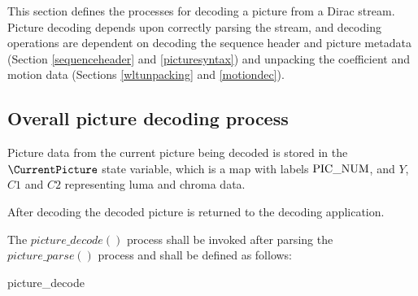 
\label{picturedec}

This section defines the processes for decoding a picture from a Dirac stream. 
Picture decoding depends upon correctly parsing the stream, and decoding operations
 are dependent on decoding the sequence header and picture metadata 
(Section \ref{sequenceheader} and \ref{picturesyntax}) and unpacking the coefficient 
and motion data (Sections \ref{wltunpacking} and \ref{motiondec}).

\subsection{Overall picture decoding process}
\label{overallpicturedec}

Picture data from the current picture being decoded is stored in the $\CurrentPicture$ state
variable, which is a map with labels $\text{PIC\_NUM}$, and $Y$, $C1$ and $C2$ representing
luma and chroma data.

After decoding the decoded picture is returned to the decoding application.

The $picture\_decode()$ process shall be invoked after parsing the $picture\_parse()$ process and shall be defined as follows:

\begin{pseudo}{picture\_decode}{}
\bsCODE{\CurrentPicture=\{\}}
\bsCODE{\CurrentPicture[\PicNum]=\PictureNumber}
\bsEND
\bsIF{\ZeroResidual==\false}
\bsELSE
\bsEND
{}
    \bsEND
\bsEND
{}
\bsEND
{}
\bsRET{\CurrentPicture}
\end{pseudo}


